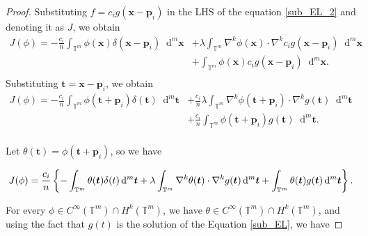 \documentclass[multixcb]{amstext-l}
\theoremstyle{plain}
\theoremstyle{definition}
\theoremstyle{definition}
\theoremstyle{remark}
\numberwithin{equation}{chapter}
\begin{document}
\begin{proof}
Substituting $f = c_ig(\boldsymbol{x}-\boldsymbol{p}_i)$ in the LHS of the equation \ref{sub_EL_2} and  denoting it as $J$, we obtain 
\begin{equation}
\label{der_sub_EL_1}
\begin{aligned}
J(\phi) = -\frac{c_i}{n}\int_{\mathbb{T}^m} \phi(\boldsymbol{x})\delta(\boldsymbol{x}-\boldsymbol{p}_i)\mathop{}\!\mathrm{d}^m\boldsymbol{x} &+ \lambda\int_{\mathbb{T}^m} \nabla^k\phi(\boldsymbol{x})\cdot\nabla^k c_ig(\boldsymbol{x}-\boldsymbol{p}_i)\mathop{}\!\mathrm{d}^m\boldsymbol{x}\\
&+ \int_{\mathbb{T}^m} \phi(\boldsymbol{x})c_ig(\boldsymbol{x}-\boldsymbol{p}_i)\mathop{}\!\mathrm{d}^m\boldsymbol{x}.\\
\end{aligned}
\end{equation}
Substituting $\boldsymbol{t} = \boldsymbol{x}-\boldsymbol{p}_i$, we obtain
\begin{equation}
    \label{der_sub_EL_2}
    \begin{aligned}
     J(\phi) = -\frac{c_i}{n}\int_{\mathbb{T}^m} \phi(\boldsymbol{t}+\boldsymbol{p}_i)\delta(\boldsymbol{t})\mathop{}\!\mathrm{d}^m\boldsymbol{t} &+ \frac{c_i}{n}\lambda\int_{\mathbb{T}^m} \nabla^k\phi(\boldsymbol{t}+\boldsymbol{p}_i)\cdot\nabla^k g(\boldsymbol{t})\mathop{}\!\mathrm{d}^m\boldsymbol{t}\\
     &+ \frac{c_i}{n}\int_{\mathbb{T}^m} \phi(\boldsymbol{t}+\boldsymbol{p}_i)g(\boldsymbol{t})\mathop{}\!\mathrm{d}^m\boldsymbol{t}.\\
     \end{aligned}
\end{equation}

Let $\theta(\boldsymbol{t}) = \phi(\boldsymbol{t}+\boldsymbol{p}_i)$, so we have 

\begin{equation}
    \label{der_sub_EL_3}
     J(\phi) = \frac{c_i}{n}\left\{-\int_{\mathbb{T}^m} \theta(\boldsymbol{t})\delta(t)\mathop{}\!\mathrm{d}^m\boldsymbol{t} + \lambda\int_{\mathbb{T}^m} \nabla^k\theta(\boldsymbol{t})\cdot\nabla^k g(\boldsymbol{t})\mathop{}\!\mathrm{d}^m\boldsymbol{t} + \int_{\mathbb{T}^m} \theta(\boldsymbol{t})g(\boldsymbol{t})\mathop{}\!\mathrm{d}^m\boldsymbol{t}\right\}.\\
\end{equation}



For every $\phi \in C^{\infty}(\mathbb{T}^m)\cap H^k(\mathbb{T}^m)$, we have $\theta \in C^{\infty}(\mathbb{T}^m)\cap H^k(\mathbb{T}^m)$, and using the fact that $g(t)$ is the solution of the Equation \ref{sub_EL}, we have


\end{proof}
\end{document}
